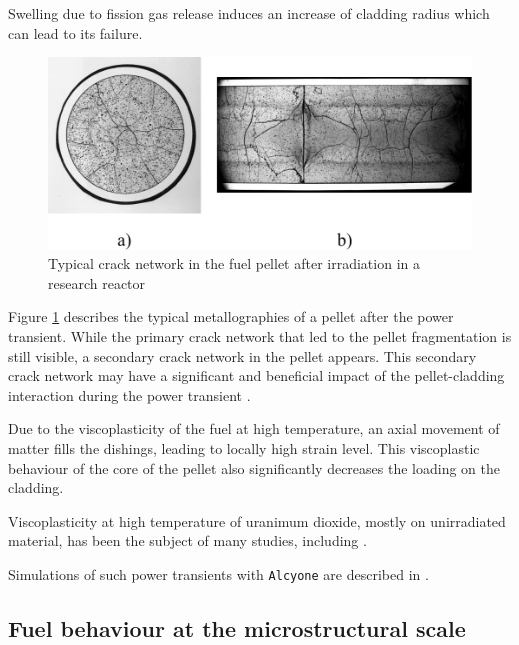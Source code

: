Swelling due to fission gas release induces an increase of cladding
radius which can lead to its failure.


\begin{figure}[H]
  \centering
  \includegraphics[width=10.cm]{../chapter_00_introduction/figures/CrackNetwork2.pdf}
  \caption{Typical crack network in the fuel pellet after irradiation in a research reactor}
  \label{fig:hho:crack_network_2}
\end{figure}

Figure \ref{fig:hho:crack_network_2} describes the typical metallographies of
a pellet after the power transient. While the primary crack network that
led to the pellet fragmentation is still visible, a secondary crack
network in the pellet appears. This secondary crack network may have a
significant and beneficial impact of the pellet-cladding interaction
during the power transient \cite{michel_3d_2008}.

Due to the viscoplasticity of the fuel at high temperature, an axial
movement of matter fills the dishings, leading to locally high strain
level. This viscoplastic behaviour of the core of the pellet also
significantly decreases the loading on the cladding.

Viscoplasticity at high temperature of uranimum dioxide, mostly
on unirradiated material, has been the subject of many studies,
including
\cite{colin_etude_2003,monerie_overall_2006, salvo_experimental_2015, salvo_experimental_2015-1, garcia_effect_2020}.

Simulations of such power transients with \texttt{Alcyone} are described in
\cite{helfer_etude_2006, michel_3d_2008}.

\subsection{Fuel behaviour at the microstructural scale}


